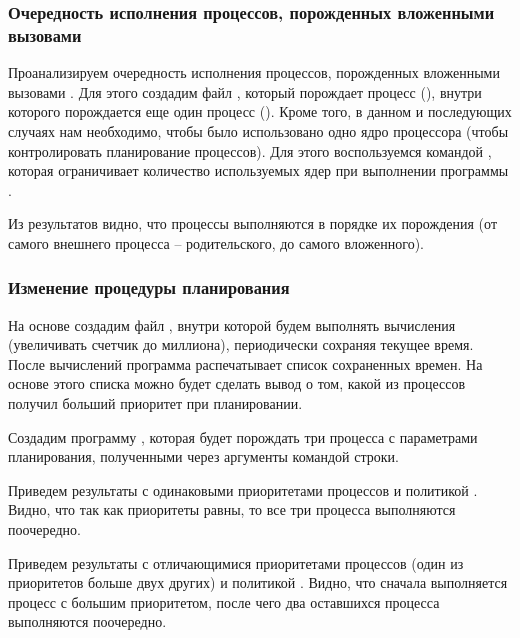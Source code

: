 \subsubsection{Очередность исполнения процессов, порожденных вложенными вызовами }

Проанализируем очередность исполнения процессов, порожденных вложенными вызовами . Для этого создадим файл , который порождает процесс (), внутри которого порождается еще один процесс (). Кроме того, в данном и последующих случаях нам необходимо, чтобы было использовано одно ядро процессора (чтобы контролировать планирование процессов). Для этого воспользуемся командой , которая ограничивает количество используемых ядер при выполнении программы .





Из результатов видно, что процессы выполняются в порядке их порождения (от самого внешнего процесса -- родительского, до самого вложенного).

\subsubsection{Изменение процедуры планирования}

На основе  создадим файл , внутри которой будем выполнять вычисления (увеличивать счетчик до миллиона), периодически сохраняя текущее время. После вычислений программа распечатывает список сохраненных времен. На основе этого списка можно будет сделать вывод о том, какой из процессов получил больший приоритет при планировании. 



Создадим программу , которая будет порождать три процесса  с параметрами планирования, полученными через аргументы командой строки. 



Приведем результаты с одинаковыми приоритетами процессов и политикой . Видно, что так как приоритеты равны, то все три процесса выполняются поочередно.


Приведем результаты с отличающимися приоритетами процессов (один из приоритетов больше двух других) и политикой . Видно, что сначала выполняется процесс с большим приоритетом, после чего два оставшихся процесса выполняются поочередно.


